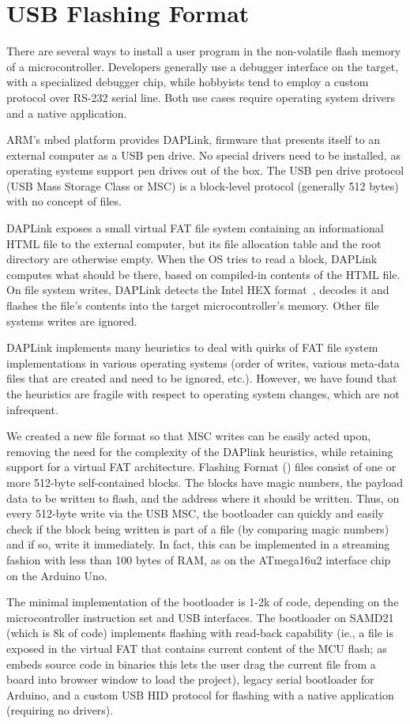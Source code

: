 \section{USB Flashing Format}
\label{sec:uf2}

There are several ways to install a user program in the non-volatile flash memory
of a microcontroller. Developers generally use a debugger
interface on the target, with a specialized debugger chip, 
while hobbyists tend to employ a custom protocol over RS-232 serial
line. Both use cases require operating system drivers and a native application.

ARM's mbed platform provides DAPLink, firmware that presents itself to an external computer
as a USB pen drive. No special drivers need to be installed, as operating
systems support pen drives out of the box. The USB pen drive protocol (USB Mass
Storage Class or MSC) is a block-level protocol (generally 512 bytes) with no
concept of files.

DAPLink exposes a small virtual FAT file system containing an informational HTML file
to the external computer, 
but its file allocation table and the root directory are otherwise empty.
When the OS tries to read a block, DAPLink computes what should be there, 
based on compiled-in contents of the HTML file.
On file system writes, DAPLink detects the Intel HEX format~\cite{IntelHEX}, 
decodes it and flashes the file's contents into the target microcontroller's memory. 
Other file systems writes are ignored.

DAPLink implements many heuristics to deal with quirks of FAT file
system implementations in various operating systems (order of writes, various meta-data files
that are created and need to be ignored, etc.).  However, we have found that the
heuristics are fragile with respect to operating system changes, which are not infrequent.

We created a new file format so that MSC writes can be easily acted upon, removing
the need for the complexity of the DAPlink heuristics, while retaining support for 
a virtual FAT architecture.
Flashing Format (\UF) files consist of one or more 512-byte self-contained blocks.
The blocks have magic numbers, the payload data to be written to flash,
and the address where it should be written.
Thus, on every 512-byte write via the USB MSC, the bootloader can quickly and easily
check if the block being written is part of a \UF file (by comparing magic numbers)
and if so, write it immediately. In fact, this can be implemented in a streaming
fashion with less than 100 bytes of RAM, as on the ATmega16u2 interface chip
on the Arduino Uno.

The minimal implementation of the \UF bootloader is 1-2k of code, depending
on the microcontroller instruction set and USB interfaces.
The bootloader on SAMD21 (which is 8k of code) implements \UF flashing with read-back capability (ie.,
a \UF file is exposed in the virtual FAT that contains current content of the 
MCU flash; as \MC embeds source code in binaries this lets the user drag the current \UF file from
a board into \MC browser window to load the project), legacy serial bootloader for Arduino, 
and a custom USB HID protocol for flashing with a native application (requiring no drivers).

